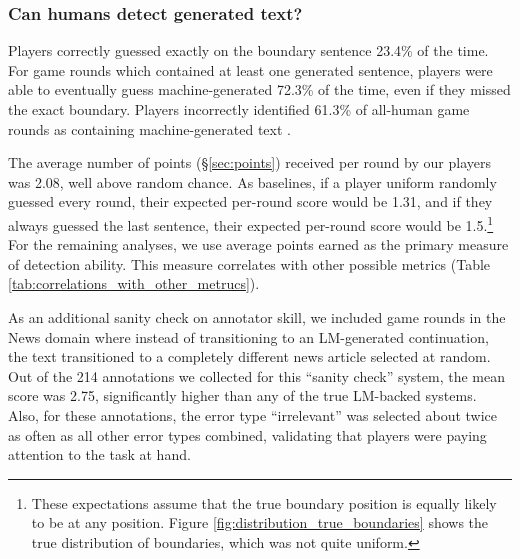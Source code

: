 \subsubsection{Can humans detect generated text?}
Players correctly guessed exactly on the boundary sentence 23.4\% of the time.
For game rounds which contained at least one generated sentence, players were able to eventually guess machine-generated 72.3\% of the time, even if they missed the exact boundary. %
Players incorrectly identified 61.3\% of all-human game rounds as containing machine-generated text .

The average number of points (\S\ref{sec:points}) received per round by our players was 2.08, well above random chance.
As baselines, if a player uniform randomly guessed every round, their expected per-round score would be 1.31, and
if they always guessed the last sentence, their expected per-round score would be 1.5.\footnote{These expectations assume that the true boundary position is equally likely to be at any position. Figure \ref{fig:distribution_true_boundaries} shows the true distribution of boundaries, which was not quite uniform.}
For the remaining analyses, we use average points earned as the primary measure of detection ability.
This measure correlates with other possible metrics (Table \ref{tab:correlations_with_other_metrucs}).

As an additional sanity check on annotator skill, we included game rounds in the News domain where instead of transitioning to an LM-generated continuation, the text transitioned to a completely different news article selected at random.
Out of the 214 annotations we collected for this ``sanity check'' system, the mean score was 2.75, significantly higher than any of the true LM-backed systems.
Also, for these annotations, the error type ``irrelevant'' was selected about twice as often as all other error types combined, validating that players were paying attention to the task at hand.

